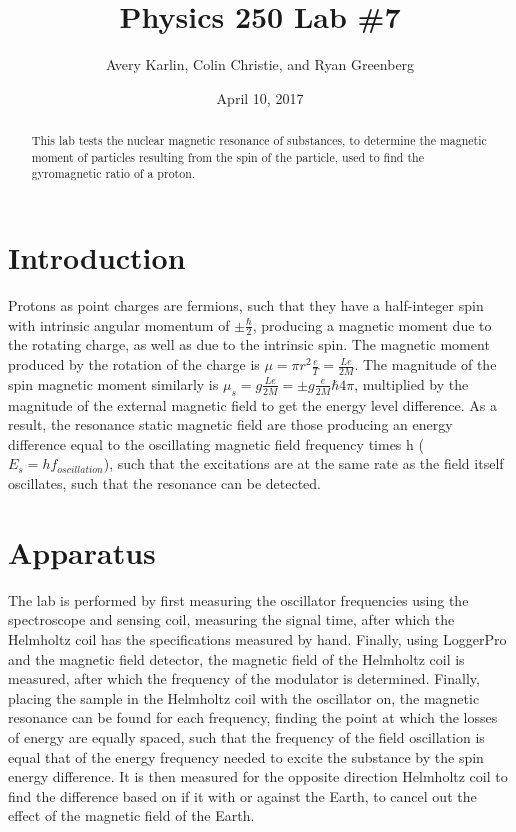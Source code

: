 \documentclass[11pt]{article}
\title{Physics 250 Lab \#7}
\author{Avery Karlin, Colin Christie, and Ryan Greenberg}
\date{April 10, 2017}
\begin{document}
\maketitle
\begin{abstract} This lab tests the nuclear magnetic resonance of substances, to determine the magnetic moment of particles resulting from the spin of the particle, used to find the gyromagnetic ratio of a proton.
\end{abstract}

\section{Introduction}
Protons as point charges are fermions, such that they have a half-integer spin with intrinsic angular momentum of $\pm \frac{\hbar}{2}$, producing a magnetic moment due to the rotating charge, as well as due to the intrinsic spin. The magnetic moment produced by the rotation of the charge is $\mu = \pi r^2 \frac{e}{T} = \frac{Le}{2M}$. The magnitude of the spin magnetic moment similarly is $\mu_s = g\frac{Le}{2M} = \pm g \frac{e}{2M}{\hbar}{4\pi}$, multiplied by the magnitude of the external magnetic field to get the energy level difference. As a result, the resonance static magnetic field are those producing an energy difference equal to the oscillating magnetic field frequency times h ($E_s = hf_{oscillation}$), such that the excitations are at the same rate as the field itself oscillates, such that the resonance can be detected.

\section{Apparatus}

The lab is performed by first measuring the oscillator frequencies using the spectroscope and sensing coil, measuring the signal time, after which the Helmholtz coil has the specifications measured by hand. Finally, using LoggerPro and the magnetic field detector, the magnetic field of the Helmholtz coil is measured, after which the frequency of the modulator is determined. Finally, placing the sample in the Helmholtz coil with the oscillator on, the magnetic resonance can be found for each frequency, finding the point at which the losses of energy are equally spaced, such that the frequency of the field oscillation is equal that of the energy frequency needed to excite the substance by the spin energy difference. It is then measured for the opposite direction Helmholtz coil to find the difference based on if it with or against the Earth, to cancel out the effect of the magnetic field of the Earth.
\end{document}
